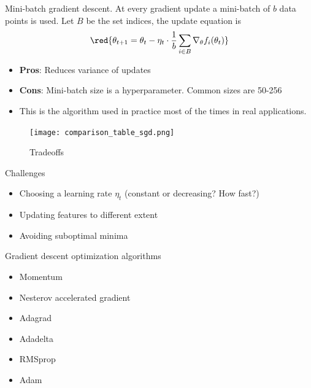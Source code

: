 \documentclass[english]{article}
\begin{document}
\item {Mini-batch gradient descent}.
At every gradient update a mini-batch of $b$ data points is used. Let $B$ be the set indices, the update equation is
$$\red{\theta_{t+1} = \theta_t - \eta_t \cdot \frac1b \sum_{i \in B} \nabla_\theta f_{i}(\theta_t)}$$

\begin{itemize}
\item \textbf{Pros}: Reduces variance of updates
\item \textbf{Cons}: Mini-batch size is a hyperparameter. Common sizes are 50-256

\item This is the algorithm used in practice most of the times in real applications.
\end{itemize}







\begin{figure}
\begin{center}
\caption{Tradeoffs}
\texttt{[image: comparison\_table\_sgd.png]}
    \label{Tradeoffs}
\end{center}
\end{figure}






\item {Challenges}
\begin{itemize}
\item Choosing a learning rate $\eta_t$ (constant or decreasing? How fast?)

\item Updating features to different extent

\item Avoiding suboptimal minima
\end{itemize}









\item {Gradient descent optimization algorithms}
\begin{itemize}
\item Momentum
\item Nesterov accelerated gradient
\item Adagrad
\item Adadelta
\item RMSprop
\item Adam
\end{itemize}
\end{document}
